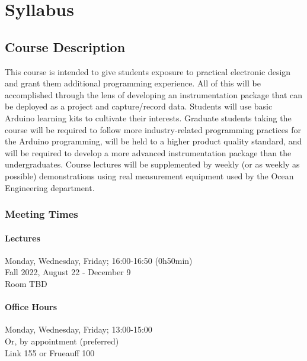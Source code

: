 \renewcommand{\thefootnote}{\arabic{footnote}}




\chapter{Syllabus} 

\section*{Course Description} 
This course is intended to give students exposure to practical electronic design and grant them additional programming experience. 
All of this will be accomplished through the lens of developing an instrumentation package that can be deployed as a project and capture/record data. 
Students will use basic Arduino learning kits to cultivate their interests. 
Graduate students taking the course will be required to follow more industry-related programming practices for the Arduino programming, will be held to a higher product quality standard, and will be required to develop a more advanced instrumentation package than the undergraduates. 
Course lectures will be supplemented by weekly (or as weekly as possible) demonstrations using real measurement equipment used by the Ocean Engineering department.

    \subsection*{Meeting Times}
        \subsubsection*{Lectures}
        Monday, Wednesday, Friday; 16:00-16:50 (0h50min)\\
        Fall 2022, August 22 - December 9\\
        Room TBD

        \subsubsection*{Office Hours}
        Monday, Wednesday, Friday; 13:00-15:00\\
        Or, by appointment (preferred)\\
        Link 155 or Frueauff 100


